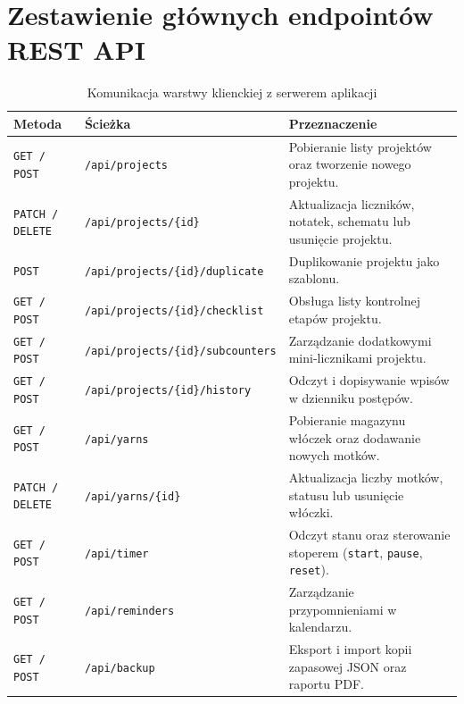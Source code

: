 \documentclass[11pt, a4paper]{article}
\begin{document}
\section{Zestawienie głównych endpointów REST API}
\begin{table}[h!]
\centering
\caption{Komunikacja warstwy klienckiej z serwerem aplikacji}
\vspace{6pt}
\begin{tabularx}{\textwidth}{l l X}
\toprule
\textbf{Metoda} & \textbf{Ścieżka} & \textbf{Przeznaczenie} \\
\midrule
\texttt{GET / POST} & \texttt{/api/projects} & Pobieranie listy projektów oraz tworzenie nowego projektu. \\
\texttt{PATCH / DELETE} & \texttt{/api/projects/\{id\}} & Aktualizacja liczników, notatek, schematu lub usunięcie projektu. \\
\texttt{POST} & \texttt{/api/projects/\{id\}/duplicate} & Duplikowanie projektu jako szablonu. \\
\texttt{GET / POST} & \texttt{/api/projects/\{id\}/checklist} & Obsługa listy kontrolnej etapów projektu. \\
\texttt{GET / POST} & \texttt{/api/projects/\{id\}/subcounters} & Zarządzanie dodatkowymi mini-licznikami projektu. \\
\texttt{GET / POST} & \texttt{/api/projects/\{id\}/history} & Odczyt i dopisywanie wpisów w dzienniku postępów. \\
\texttt{GET / POST} & \texttt{/api/yarns} & Pobieranie magazynu włóczek oraz dodawanie nowych motków. \\
\texttt{PATCH / DELETE} & \texttt{/api/yarns/\{id\}} & Aktualizacja liczby motków, statusu lub usunięcie włóczki. \\
\texttt{GET / POST} & \texttt{/api/timer} & Odczyt stanu oraz sterowanie stoperem (\texttt{start}, \texttt{pause}, \texttt{reset}). \\
\texttt{GET / POST} & \texttt{/api/reminders} & Zarządzanie przypomnieniami w kalendarzu. \\
\texttt{GET / POST} & \texttt{/api/backup} & Eksport i import kopii zapasowej JSON oraz raportu PDF. \\
\bottomrule
\end{tabularx}
\end{table}
\end{document}
